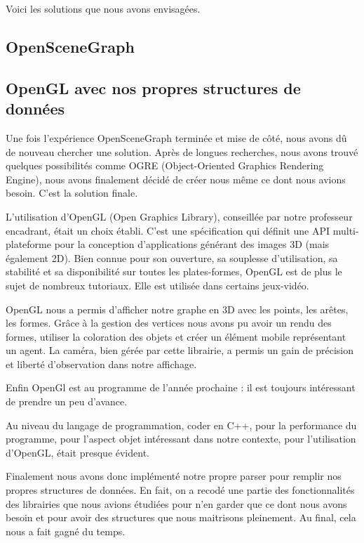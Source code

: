 \documentclass[a4paper,12pt]{report}
\begin{document}
Voici les solutions que nous avons envisagées.
 
\subsection{OpenSceneGraph}

\subsection{OpenGL avec nos propres structures de données}

Une fois l'expérience OpenSceneGraph terminée et mise de côté, nous avons dû de nouveau chercher une solution. Après de longues recherches, nous avons trouvé quelques possibilités comme OGRE (Object-Oriented Graphics Rendering Engine), nous avons finalement décidé de créer nous même ce dont nous avions besoin. C'est la solution finale.

L'utilisation d'OpenGL (Open Graphics Library), conseillée par notre professeur encadrant, était un choix établi. C'est une spécification qui définit une API multi-plateforme pour la conception d'applications générant des images 3D (mais également 2D). Bien connue pour son ouverture, sa souplesse d'utilisation, sa stabilité et sa disponibilité sur toutes les plates-formes, OpenGL est de plus le sujet de nombreux tutoriaux. Elle est utilisée dans certains jeux-vidéo.

OpenGL nous a permis d'afficher notre graphe en 3D avec les points, les arêtes, les formes. Grâce à la gestion des vertices nous avons pu avoir un rendu des formes, utiliser la coloration des objets et créer un élément mobile représentant un agent. La caméra, bien gérée par cette librairie, a permis un gain de précision et liberté d'observation dans notre affichage.

Enfin OpenGl est au programme de l'année prochaine : il est toujours intéressant de prendre un peu d'avance. 

Au niveau du langage de programmation, coder en C++, pour la performance du programme, pour l'aspect objet intéressant dans notre contexte, pour l'utilisation d'OpenGL, était presque évident.

Finalement nous avons donc implémenté notre propre parser pour remplir nos propres structures de données. En fait, on a recodé une partie des fonctionnalités des librairies que nous avions étudiées pour n'en garder que ce dont nous avons besoin et pour avoir des structures que nous maitrisons pleinement. Au final, cela nous a fait gagné du temps.
\end{document}
